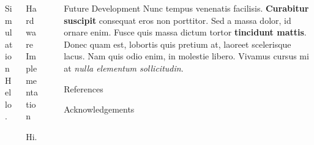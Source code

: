\documentclass[final]{beamer}
\newlength{\sepwid}
\newlength{\onecolwid}
\newlength{\twocolwid}
\begin{document}
\begin{frame}[t]
\begin{columns}[t]
\begin{column}{\twocolwid}
\begin{columns}[t,totalwidth=\twocolwid]
\begin{column}{\onecolwid}
\begin{block}{Simulation}
	Hello.

\end{block}\end{column}

\begin{column}{\onecolwid}\begin{block}{Hardware Implementation}
	
	Hi.

\end{block}\end{column} 

\end{columns} 

\end{column}

\begin{column}{\sepwid}\end{column}

\begin{column}{\onecolwid}

	\begin{block}{Future Development}
		Nunc tempus venenatis facilisis. \textbf{Curabitur suscipit} consequat eros non porttitor. Sed a massa dolor, id ornare enim. Fusce quis massa dictum tortor \textbf{tincidunt mattis}. Donec quam est, lobortis quis pretium at, laoreet scelerisque lacus. Nam quis odio enim, in molestie libero. Vivamus cursus mi at \textit{nulla elementum sollicitudin}.
	\end{block}


	\begin{block}{References}
		\nocite{*}
		\small{\vspace{0.75in}}
	\end{block}

	\begin{block}{Acknowledgements}
		\small{}
	\end{block}


\end{column}

\end{columns}
\end{frame}
\end{document}
